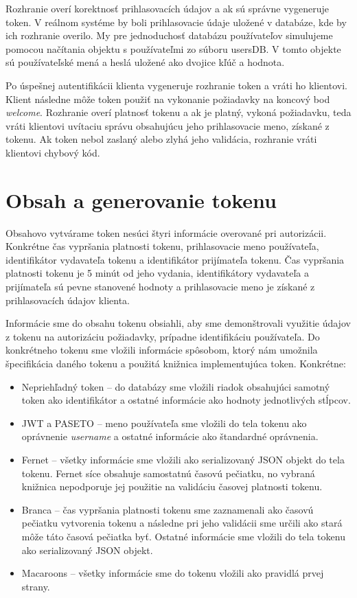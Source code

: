 Rozhranie overí korektnosť prihlasovacích údajov a ak sú správne vygeneruje token. V reálnom systéme by boli prihlasovacie údaje uložené v databáze, kde by ich rozhranie overilo. My pre jednoduchosť databázu používateľov simulujeme pomocou načítania objektu s používateľmi zo súboru usersDB. V tomto objekte sú používateľské mená a heslá uložené ako dvojice kľúč a hodnota.

Po úspešnej autentifikácii klienta vygeneruje rozhranie token a vráti ho klientovi. Klient následne môže token použiť na vykonanie požiadavky na koncový bod \textit{welcome}. Rozhranie overí platnosť tokenu a ak je platný, vykoná požiadavku, teda vráti klientovi uvítaciu správu obsahujúcu jeho prihlasovacie meno, získané z tokenu. Ak token nebol zaslaný alebo zlyhá jeho validácia, rozhranie vráti klientovi chybový kód.

\section{Obsah a generovanie tokenu}
\label{sec:obsah}

Obsahovo vytvárame token nesúci štyri informácie overované pri autorizácii. Konkrétne čas vypršania platnosti tokenu, prihlasovacie meno používateľa, identifikátor vydavateľa tokenu a identifikátor prijímateľa tokenu. Čas vypršania platnosti tokenu je 5 minút od jeho vydania, identifikátory vydavateľa a prijímateľa sú pevne stanovené hodnoty a prihlasovacie meno je získané z prihlasovacích údajov klienta.

Informácie sme do obsahu tokenu obsiahli, aby sme demonštrovali využitie údajov z tokenu na autorizáciu požiadavky, prípadne identifikáciu používateľa. Do konkrétneho tokenu sme vložili informácie spôsobom, ktorý nám umožnila špecifikácia daného tokenu a použitá knižnica implementujúca token. Konkrétne:


\begin{itemize}
    \item Nepriehľadný token -- do databázy sme vložili riadok obsahujúci samotný token ako identifikátor a ostatné informácie ako hodnoty jednotlivých stĺpcov.
    \item JWT a PASETO -- meno používateľa sme vložili do tela tokenu ako oprávnenie \textit{username} a ostatné informácie ako štandardné oprávnenia.
    \item Fernet -- všetky informácie sme vložili ako serializovaný JSON objekt do tela tokenu. Fernet síce obsahuje samostatnú časovú pečiatku, no vybraná knižnica nepodporuje jej použitie na validáciu časovej platnosti tokenu.
    \item Branca -- čas vypršania platnosti tokenu sme zaznamenali ako časovú pečiatku vytvorenia tokenu a následne pri jeho validácii sme určili ako stará môže táto časová pečiatka byť. Ostatné informácie sme vložili do tela tokenu ako serializovaný JSON objekt.
    \item Macaroons -- všetky informácie sme do tokenu vložili ako pravidlá prvej strany.
\end{itemize}

